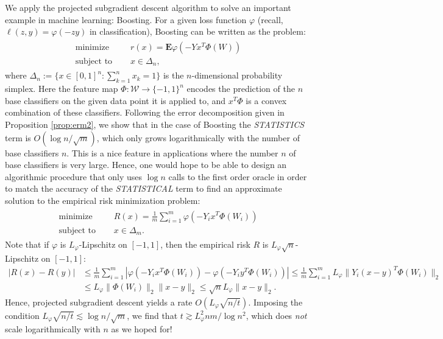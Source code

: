 We apply the projected subgradient descent algorithm to solve an important example in machine learning: Boosting. For a given loss function $\varphi$ (recall, $\ell(z,y) = \varphi(-zy)$ in classification), Boosting can be written as the problem:
\begin{align*}
	\begin{aligned}
		\text{minimize }\quad   & r(x) = \mathbf{E} \varphi(-Yx^T\Phi(W))\\
		\text{subject to }\quad & x\in \Delta_n,
	\end{aligned}
\end{align*}
where $\Delta_n := \{x\in [0,1]^n : \sum_{k=1}^n x_k = 1\}$ is the $n$-dimensional probability simplex. Here the feature map $\Phi : \mathcal{W} \rightarrow \{-1,1\}^n$ encodes the prediction of the $n$ base classifiers on the given data point it is applied to, and $x^T\Phi$ is a convex combination of these classifiers. 
Following the error decomposition given in Proposition \ref{prop:erm2}, we show that in the case of Boosting the \emph{STATISTICS} term is $O(\log n/\sqrt{m})$, which only grows logarithmically with the number of base classifiers $n$. This is a nice feature in applications where the number $n$ of base classifiers is very large.
Hence, one would hope to be able to design an algorithmic procedure that only uses $\log n$ calls to the first order oracle in order to match the accuracy of the \emph{STATISTICAL} term to find an approximate solution to the empirical risk minimization problem:
\begin{align*}
	\begin{aligned}
		\text{minimize }\quad   & R(x) = \frac{1}{m} \sum_{i=1}^m \varphi(-Y_ix^T\Phi(W_i))\\
		\text{subject to }\quad & x\in \Delta_m.
	\end{aligned}
\end{align*}
Note that if $\varphi$ is $L_\varphi$-Lipschitz on $[-1,1]$, then the empirical risk $R$ is $L_\varphi\sqrt{n}$-Lipschitz on $[-1,1]$:
\begin{align*}
	|R(x)-R(y)| 
	&\le \frac{1}{m} \sum_{i=1}^m | \varphi(-Y_ix^T\Phi(W_i)) - \varphi(-Y_iy^T\Phi(W_i)) |
	\le 
	\frac{1}{m} \sum_{i=1}^m L_\varphi \| Y_i(x-y)^T\Phi(W_i) \|_2\\
	&\le L_\varphi \| \Phi(W_i) \|_2 \| x-y \|_2
	\le \sqrt{n}L_\varphi \| x-y \|_2.
\end{align*}
Hence, projected subgradient descent yields a rate $O(L_\varphi\sqrt{n/t})$. Imposing the condition $L_\varphi\sqrt{n/t} \lesssim \log n/\sqrt{m}$, we find that $t\gtrsim L^2_\varphi nm/\log n^2$, which does \emph{not} scale logarithmically with $n$ as we hoped for!

